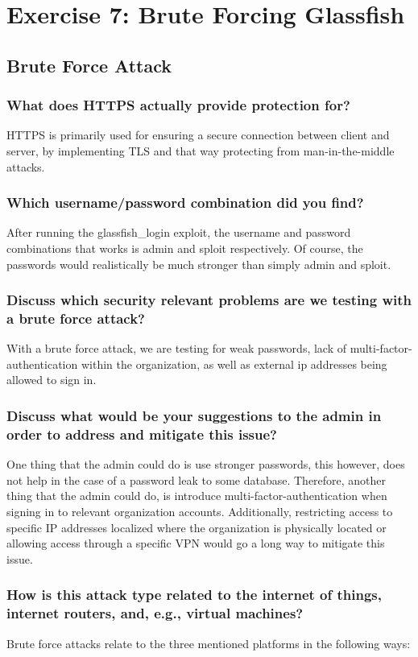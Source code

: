 \section{Exercise 7: Brute Forcing Glassfish}
\subsection{Brute Force Attack}
\subsubsection{What does HTTPS actually provide protection for?}
HTTPS is primarily used for ensuring a secure connection between client and server, by implementing TLS and that way protecting from man-in-the-middle attacks.
\subsubsection{Which username/password combination did you find?}
After running the glassfish\_login exploit, the username and password combinations that works is admin and sploit respectively. Of course, the passwords would realistically be much stronger than simply admin and sploit.

\subsubsection{Discuss which security relevant problems are we
    testing with a brute force attack?}
With a brute force attack, we are testing for weak passwords, lack of multi-factor-authentication within the organization, as well as external ip addresses being allowed to sign in.
\subsubsection{Discuss what would be your suggestions to the admin
    in order to address and mitigate this issue?}
One thing that the admin could do is use stronger passwords, this however, does not help in the case of a password leak to some database. Therefore, another thing that the admin could do, is introduce multi-factor-authentication when signing in to relevant organization accounts. Additionally, restricting access to specific IP addresses localized where the organization is physically located or allowing access through a specific VPN would go a long way to mitigate this issue.
\subsubsection{How is this attack type related to the internet of things,
    internet routers, and, e.g., virtual machines?}
Brute force attacks relate to the three mentioned platforms in the following ways:

